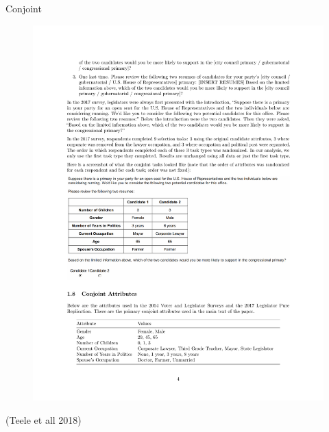 \documentclass[
  ignorenonframetext,
]{beamer}
\begin{document}
\begin{frame}{Conjoint}
\begin{figure}
{\centering \includegraphics[width=0.9\linewidth]{./figs/survey-exp-teele-2018-conjoint-attributes} 

}

\end{figure}

(Teele et all 2018)
\end{frame}
\end{document}
